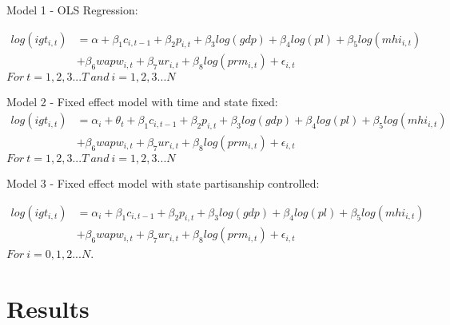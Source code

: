 Model 1 - OLS Regression:

\begin{equation}
    \begin{split}
        log(igt_{i,t}) & = \alpha + \beta_1 c_{i,t-1} + \beta_2 p_{i,t} + \beta_3 log(gdp) + \beta_4 log(pl) + \beta_5 log(mhi_{i,t}) \\
        & + \beta_6 wapw_{i,t} + \beta_7 ur_{i,t} +\beta_8 log(prm_{i,t}) + \epsilon_{i,t}
    \end{split}
\end{equation}
$For\ t = 1, 2, 3...T\ and\ i = 1, 2, 3...N $

Model 2 - Fixed effect model with time and state fixed:
\begin{equation}
    \begin{split}
        log(igt_{i,t}) & = \alpha_i + \theta_t + \beta_1 c_{i,t-1} + \beta_2 p_{i,t} + \beta_3 log(gdp) + \beta_4 log(pl) + \beta_5 log(mhi_{i,t}) \\
        &+ \beta_6 wapw_{i,t} + \beta_7 ur_{i,t} +\beta_8 log(prm_{i,t}) + \epsilon_{i,t}
    \end{split}
\end{equation}
$For\ t = 1, 2, 3...T\ and\ i = 1, 2, 3...N $

Model 3 - Fixed effect model with state partisanship controlled:

\begin{equation}
    \begin{split}
        log(igt_{i,t}) & = \alpha_i + \beta_1 c_{i,t-1} + \beta_2 p_{i,t} + \beta_3 log(gdp) + \beta_4 log(pl) + \beta_5 log(mhi_{i,t}) \\
        &+ \beta_6 wapw_{i,t} + \beta_7 ur_{i,t} +\beta_8 log(prm_{i,t}) + \epsilon_{i,t}
    \end{split}
\end{equation}
$For\ i = 0,1,2...N$.



\section{Results}


